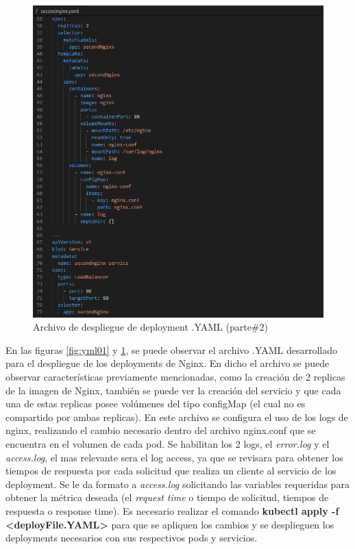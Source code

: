 \begin{figure}[htpb!]
	\centering
	\includegraphics[width=0.95\columnwidth]{images/captures/podnginx/second02.PNG}
	\caption{Archivo de despliegue de deployment .YAML (parte\#2)}
	\label{fig:yml02}
\end{figure}

\par En las figuras \ref{fig:yml01} y \ref{fig:yml02}, se puede observar el archivo .YAML desarrollado para el despliegue de los deployments de Nginx. En dicho el archivo se puede observar características previamente mencionadas, como la creación de 2 replicas de la imagen de Nginx, también se puede ver la creación del servicio y que cada una de estas replicas posee volúmenes del tipo configMap (el cual no es compartido por ambas replicas). En este archivo se configura el uso de los logs de nginx, realizando el cambio necesario dentro del archivo nginx.conf que se encuentra en el volumen de cada pod. Se habilitan los 2 logs, el \textit{error.log} y el \textit{access.log}, el mas relevante sera el log access, ya que se revisara para obtener los tiempos de respuesta por cada solicitud que realiza un cliente al servicio de los deployment. Se le da formato a \textit{access.log} solicitando las variables requeridas para obtener la métrica deseada (el \textit{request time} o tiempo de solicitud, tiempos de respuesta o response time). Es necesario realizar el comando \textbf{kubectl apply -f <deployFile.YAML>} para que se apliquen los cambios y se desplieguen los deployments necesarios con sus respectivos pods y servicios.\\

